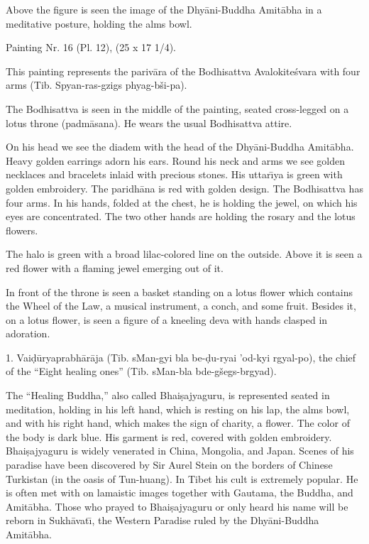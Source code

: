 \documentclass[a4paper, 12pt, oneside]{article}
\begin{document}
Above the figure is seen the image of the Dhy\={a}ni-Buddha Amit\={a}bha in a meditative posture, holding the alms bowl.

\bigskip

Painting Nr. 16 (Pl. 12), (25 x 17 1/4).

\bigskip

This painting represents the pariv\={a}ra of the Bodhisattva Avalokite\'{s}vara with four arms (Tib. Spyan-ras-gzigs phyag-bši-pa).

The Bodhisattva is seen in the middle of the painting, seated cross-legged on a lotus throne (padm\={a}sana). He wears the usual Bodhisattva attire.

On his head we see the diadem with the head of the Dhy\={a}ni-Buddha Amit\={a}bha. Heavy golden earrings adorn his ears. Round his neck and arms we see golden necklaces and bracelets inlaid with precious stones. His uttar\={\i}ya is green with golden embroidery. The paridh\={a}na is red with golden design. The Bodhisattva has four arms. In his hands, folded at the chest, he is holding the jewel, on which his eyes are concentrated. The two other hands are holding the rosary and the lotus flowers.

The halo is green with a broad lilac-colored line on the outside. Above it is seen a red flower with a flaming jewel emerging out of it.

In front of the throne is seen a basket standing on a lotus flower which contains the Wheel of the Law, a musical instrument, a conch, and some fruit. Besides it, on a lotus flower, is seen a figure of a kneeling deva with hands clasped in adoration.

1. Vai\d{d}\={u}ryaprabh\={a}r\={a}ja (Tib. sMan-gyi bla be-\d{d}u-ryai 'od-kyi rgyal-po), the chief of the ``Eight healing ones'' (Tib. sMan-bla bde-gšegs-brgyad).

The ``Healing Buddha,'' also called Bhai\d{s}ajyaguru, is represented seated in meditation, holding in his left hand, which is resting on his lap, the alms bowl, and with his right hand, which makes the sign of charity, a flower. The color of the body is dark blue. His garment is red, covered with golden embroidery. Bhai\d{s}ajyaguru is widely venerated in China, Mongolia, and Japan. Scenes of his paradise have been discovered by Sir Aurel Stein on the borders of Chinese Turkistan (in the oasis of Tun-huang). In Tibet his cult is extremely popular. He is often met with on lamaistic images together with Gautama, the Buddha, and Amit\={a}bha. Those who prayed to Bhai\d{s}ajyaguru or only heard his name will be reborn in Sukh\={a}vat\={\i}, the Western Paradise ruled by the Dhy\={a}ni-Buddha Amit\={a}bha.
\end{document}
